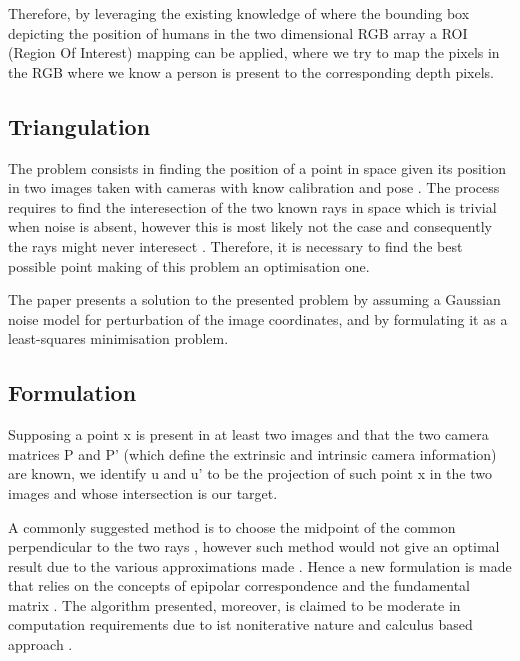 Therefore, by leveraging the existing knowledge of where the bounding box depicting the position of humans in the two dimensional RGB array a ROI (Region Of Interest) mapping can be applied, where we try to map the pixels in the RGB where we know a person is present to the corresponding depth pixels.

\subsection{Triangulation}

The problem consists in finding the position of a point in space given its position in two images taken with cameras with know calibration and pose \cite{hartley1997triangulation}. The process requires to find the interesection of the two known rays in space which is trivial when noise is absent, however this is most likely not the case and consequently the rays might never interesect \cite{hartley1997triangulation}. Therefore, it is necessary to find the best possible point \cite{hartley1997triangulation} making of this problem an optimisation one.

The paper presents a solution to the presented problem by assuming a Gaussian noise model for perturbation of the image coordinates, and by formulating it as a least-squares minimisation problem.

\subsection{Formulation}

Supposing a point x is present in at least two images and that the two camera matrices P and P' (which define the extrinsic and intrinsic camera information) are known, we identify u and u' to be the projection of such point x in the two images \cite{hartley1997triangulation} and whose intersection is our target.

A commonly suggested method is to choose the midpoint of the common perpendicular to the two rays \cite{hartley1997triangulation}, however such method would not give an optimal result due to the various approximations made \cite{hartley1997triangulation}. Hence a new formulation is made that relies on the concepts of epipolar correspondence and the fundamental matrix \cite{hartley1997triangulation}. The algorithm presented, moreover, is claimed to be moderate in computation requirements due to ist noniterative nature and calculus based approach \cite{hartley1997triangulation}.

